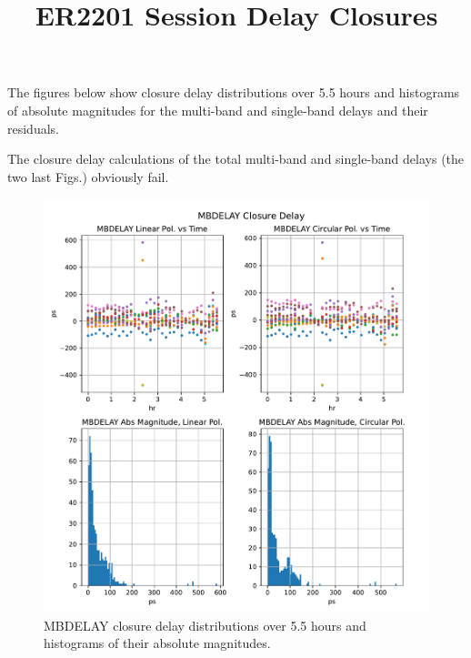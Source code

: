 \documentclass[letterpaper,twoside,12pt]{article}
\title{ER2201 Session Delay Closures}
\begin{document}
\maketitle

The figures below show closure delay distributions over 5.5 hours and histograms of absolute magnitudes for the multi-band and single-band delays and their residuals.

The closure delay calculations of the total multi-band and single-band delays (the two last Figs.) obviously fail.

\begin{figure}[ht!]
  \begin{center}
  \includegraphics[width=38pc]{MBDELAY_Closure_Delay.pdf}
  \caption{\small MBDELAY closure delay distributions over 5.5 hours and histograms of their absolute magnitudes.}
  \label{mbd}
  \end{center}
\end{figure}
\end{document}
